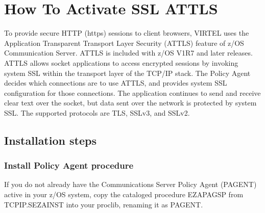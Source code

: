 \documentclass[letterpaper,10pt,english]{sphinxmanual}
\begin{document}
\section{How To Activate SSL AT\sphinxhyphen{}TLS}
\label{\detokenize{Customization:how-to-activate-ssl-at-tls}}
\sphinxAtStartPar
To provide secure HTTP (https) sessions to client browsers, VIRTEL uses the Application Transparent Transport Layer Security (AT\sphinxhyphen{}TLS) feature of z/OS Communication Server. AT\sphinxhyphen{}TLS is included with z/OS V1R7 and later releases. AT\sphinxhyphen{}TLS allows socket applications to access encrypted sessions by invoking system SSL within the transport layer of the TCP/IP stack. The Policy Agent decides which connections are to use AT\sphinxhyphen{}TLS, and provides system SSL configuration for those connections. The application continues to send and receive clear text over the socket, but data sent over the network is protected by system SSL. The supported protocols are TLS, SSLv3, and SSLv2.

\ignorespaces 

\subsection{Installation steps}
\label{\detokenize{Customization:installation-steps}}\label{\detokenize{Customization:index-100}}

\subsubsection{Install Policy Agent procedure}
\label{\detokenize{Customization:install-policy-agent-procedure}}
\sphinxAtStartPar
If you do not already have the Communications Server Policy Agent (PAGENT) active in your z/OS system, copy the cataloged procedure EZAPAGSP from TCPIP.SEZAINST into your proclib, renaming it as PAGENT.
\end{document}
